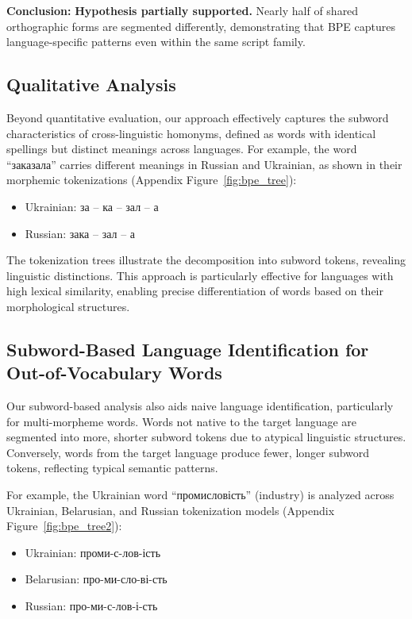 \documentclass[11pt]{article}
\begin{document}
\textbf{Conclusion:} \textbf{Hypothesis partially supported.} Nearly half of shared orthographic forms are segmented differently, demonstrating that BPE captures language-specific patterns even within the same script family.

\subsection{Qualitative Analysis}

Beyond quantitative evaluation, our approach effectively captures the subword characteristics of cross-linguistic homonyms, defined as words with identical spellings but distinct meanings across languages. For example, the word {\selectfont ``заказала''} carries different meanings in Russian and Ukrainian, as shown in their morphemic tokenizations (Appendix Figure~\ref{fig:bpe_tree}):

\begin{itemize}[noitemsep]
\item Ukrainian: {\selectfont за -- ка -- зал -- а}
\item Russian: {\selectfont зака -- зал -- а}
\end{itemize}

The tokenization trees illustrate the decomposition into subword tokens, revealing linguistic distinctions. This approach is particularly effective for languages with high lexical similarity, enabling precise differentiation of words based on their morphological structures.

\subsection{Subword-Based Language Identification for Out-of-Vocabulary Words}

Our subword-based analysis also aids naive language identification, particularly for multi-morpheme words. Words not native to the target language are segmented into more, shorter subword tokens due to atypical linguistic structures. Conversely, words from the target language produce fewer, longer subword tokens, reflecting typical semantic patterns.

For example, the Ukrainian word {\selectfont ``промисловість''} (industry) is analyzed across Ukrainian, Belarusian, and Russian tokenization models (Appendix Figure~\ref{fig:bpe_tree2}):

\begin{itemize}[noitemsep]
\item Ukrainian: {\selectfont проми-с-лов-ість}
\item Belarusian: {\selectfont про-ми-сло-ві-сть}
\item Russian: {\selectfont про-ми-с-лов-і-сть}
\end{itemize}
\end{document}
